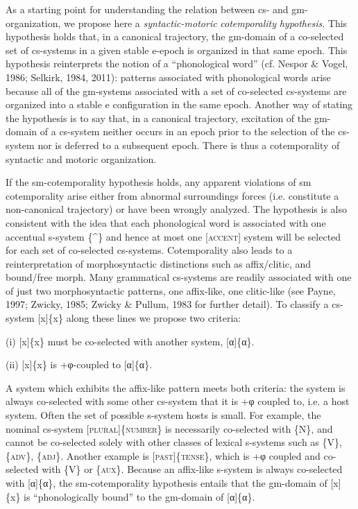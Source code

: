As a starting point for understanding the relation between cs- and gm-organization, we propose here a \textit{syntactic-motoric} \textit{cotemporality} \textit{hypothesis}. This hypothesis holds that, in a canonical trajectory, the gm-domain of a co-selected set of cs-systems in a given stable e-epoch is organized in that same epoch. This hypothesis reinterprets the notion of a “phonological word” (cf. Nespor \& Vogel, 1986; Selkirk, 1984, 2011): patterns associated with phonological words arise because all of the gm-systems associated with a set of co-selected cs-systems are organized into a stable e configuration in the same epoch. Another way of stating the hypothesis is to say that, in a canonical trajectory, excitation of the gm-domain of a cs-system neither occurs in an epoch prior to the selection of the cs-system nor is deferred to a subsequent epoch. There is thus a cotemporality of syntactic and motoric organization. 

  If the sm-cotemporality hypothesis holds, any apparent violations of sm cotemporality arise either from abnormal surroundings forces (i.e. constitute a non-canonical trajectory) or have been wrongly analyzed. The hypothesis is also consistent with the idea that each phonological word is associated with one accentual s-system \{\^{}\} and hence at most one [\textsc{accent}] system will be selected for each set of co-selected cs-systems. Cotemporality also leads to a reinterpretation of morphosyntactic distinctions such as affix/clitic, and bound/free morph. Many grammatical cs-systems are readily associated with one of just two morphosyntactic patterns, one affix-like, one clitic-like (see Payne, 1997; Zwicky, 1985; Zwicky \& Pullum, 1983 for further detail). To classify a cs-system [x]\{x\} along these lines we propose two criteria:

    (i)   [x]\{x\} must be co-selected with another system, [α]\{α\}.

    (ii)   [x]\{x\} is +φ-coupled to [α]\{α\}.

  A system which exhibits the affix-like pattern meets both criteria: the system is always co-selected with some other cs-system that it is +φ coupled to, i.e. a host system. Often the set of possible s-system hosts is small. For example, the nominal cs-system [\textsc{plural}]\{\textsc{number}\} is necessarily co-selected with \{N\}, and cannot be co-selected solely with other classes of lexical s-systems such as \{V\}, \{\textsc{adv}\}, \{\textsc{adj}\}. Another example is [\textsc{past}]\{\textsc{tense}\}, which is +φ coupled and co-selected with \{V\} or \{\textsc{aux}\}. Because an affix-like s-system is always co-selected with [α]\{α\}, the sm-cotemporality hypothesis entails that the gm-domain of [x]\{x\} is “phonologically bound” to the gm-domain of [α]\{α\}. 

